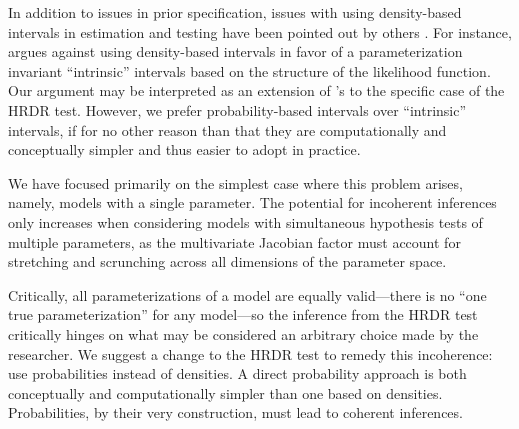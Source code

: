 \documentclass[9pt,twocolumn,twoside]{cidlab-draft}\templatetype{cidlab-invited}
\newcommand{\hdr}{HRDR}
\begin{document}
In addition to issues in prior specification, issues with using density-based intervals in estimation and testing have been pointed out by others  \cite{bernardo2005,garcia2006,robert1996intrinsic,shalloway2014}. For instance, \citeauthor{bernardo2005} argues against using density-based intervals in favor of a parameterization invariant ``intrinsic'' intervals based on the structure of the likelihood function. Our argument may be interpreted as an extension of \citeauthor{bernardo2005}'s to the specific case of the \hdr{} test. 
However, we prefer probability-based intervals over ``intrinsic'' intervals, if for no other reason than that they are computationally and conceptually simpler and thus easier to adopt in practice. 

We have focused primarily on the simplest case where this problem arises, namely, models with a single parameter. The potential for incoherent inferences only increases when considering models with simultaneous hypothesis tests of multiple parameters, as the multivariate Jacobian factor must account for stretching and scrunching across all dimensions of the parameter space. 

Critically, all parameterizations of a model are equally valid---there is no ``one true parameterization'' for any model---so the inference from the \hdr{} test critically hinges on what may be considered an arbitrary choice made by the researcher. We suggest a change to the \hdr{} test to remedy this incoherence: use probabilities instead of densities. A direct probability approach is both conceptually and computationally simpler than one based on densities. Probabilities, by their very construction, must lead to coherent inferences. 

\null
\end{document}
